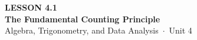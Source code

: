 \documentclass[aspectratio=169, 11pt]{beamer}
\begin{document}
{
\begin{frame}[plain]
  \vspace{2.8cm}\hspace{0.55cm}%
  \begin{minipage}{0.9\textwidth}
    {\color{goldacc}\bfseries\small LESSON 4.1}\\[0.5cm]
    {\color{white}\bfseries\LARGE The Fundamental Counting Principle}\\[1.2cm]
    {\color{mistmid}\small Algebra, Trigonometry, and Data Analysis~$\cdot$~Unit 4}
  \end{minipage}
\end{frame}
}

\begin{frame}[t, plain]
\end{frame}
\end{document}
